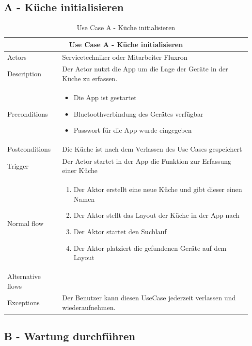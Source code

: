 \subsection{A - Küche initialisieren}
\label{subsec:A - Küche initialisieren}

\begin{table}[H]
\begin{tabular}{|p{3cm}|p{10cm}|}
  \hline
  \multicolumn{2}{|c|}{Use Case A - Küche initialisieren}
  \\\hline
  	Actors
  &
  	Servicetechniker oder Mitarbeiter Fluxron
  \\\hline
  	Description 
  &
  	Der Actor nutzt die App um die Lage der Geräte in der Küche zu erfassen.
  \\\hline
  	Preconditions 
  & 
  	\begin{itemize}
	  \item Die App ist gestartet
	  \item Bluetoothverbindung des Gerätes verfügbar
	  \item Passwort für die App wurde eingegeben
  	\end{itemize}
  \\\hline
  	Postconditions
  &
    Die Küche ist nach dem Verlassen des Use Cases gespeichert
  \\\hline
  	Trigger
  &
    Der Actor startet in der App die Funktion zur Erfassung einer Küche
  \\\hline
  	Normal flow
  &
	\begin{enumerate}
	  \item Der Aktor erstellt eine neue Küche und gibt dieser einen Namen
      \item Der Aktor stellt das Layout der Küche in der App nach
	  \item Der Aktor startet den Suchlauf
      \item Der Aktor platziert die gefundenen Geräte auf dem Layout
	\end{enumerate}
  \\\hline
    Alternative flows
  &
    
  \\\hline
    Exceptions
  &
    Der Benutzer kann diesen UseCase jederzeit verlassen und wiederaufnehmen.
  \\\hline
\end{tabular}
\caption{Use Case A - Küche initialisieren}
\end{table}

\subsection{B - Wartung durchführen}
\label{subsec:B - Wartung durchführen}

